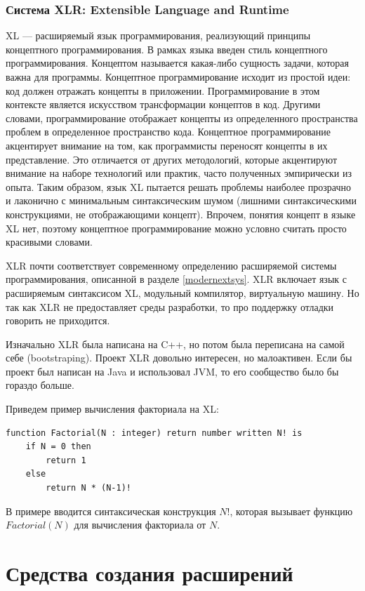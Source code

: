 \documentclass[a4paper,12pt,titlepage]{extarticle}
\begin{document}
\subsubsection*{Система XLR: Extensible Language and Runtime}
\label{xlr}
XL --- расширяемый язык программирования, реализующий принципы концептного
программирования. В рамках языка введен стиль концептного программирования.
Концептом называется какая-либо сущность задачи, которая важна для программы.
Концептное программирование исходит из простой идеи: код должен отражать концепты в приложении.
Программирование в этом контексте является искусством трансформации концептов в
код. Другими словами, программирование отображает концепты из определенного
пространства проблем в определенное пространство кода. Концептное
программирование акцентирует внимание на том, как программисты переносят
концепты в их представление. Это отличается от других методологий, которые
акцентируют внимание на наборе технологий или практик, часто полученных
эмпирически из опыта. Таким образом, язык XL пытается решать проблемы наиболее прозрачно и лаконично
с минимальным синтаксическим шумом (лишними синтаксическими конструкциями, не
отображающими концепт). Впрочем, понятия концепт в языке XL нет, поэтому
концептное программирование можно условно считать просто красивыми словами.

XLR почти соответствует современному определению расширяемой системы
программирования, описанной в разделе \ref{modernextsys}. XLR включает язык с
расширяемым синтаксисом XL, модульный компилятор, виртуальную машину. Но так как
XLR не предоставляет среды разработки, то про поддержку отладки говорить не
приходится.

Изначально XLR была написана на C++, но потом была переписана на самой себе
(bootstraping).
Проект XLR довольно интересен, но малоактивен. Если бы проект был написан на
Java и использовал JVM, то его сообщество было бы гораздо больше.

Приведем пример вычисления факториала на XL:
\begin{verbatim}
function Factorial(N : integer) return number written N! is
    if N = 0 then
        return 1
    else
        return N * (N-1)!
\end{verbatim}
В примере вводится синтаксическая конструкция $N!$, которая вызывает функцию
$Factorial(N)$ для вычисления факториала от $N$.

\section{Средства создания расширений}
\label{tools}
\end{document}
